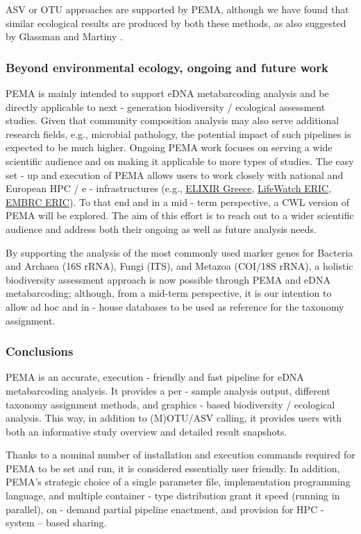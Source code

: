    ASV or OTU approaches are supported by PEMA, although we have found that similar ecological results are produced by both these methods, as also suggested by Glassman and Martiny \citep{glassman2018broadscale}.
   \subsubsection*{Beyond environmental ecology, ongoing and future work}

   PEMA is mainly intended to support eDNA metabarcoding analysis and be directly applicable to next - generation biodiversity / ecological assessment studies. 
   Given that community composition analysis may also serve additional research fields, e.g., microbial pathology, the potential impact of such pipelines is expected to be much higher. 
   Ongoing PEMA work focuses on serving a wide scientific audience and on making it applicable to more types of studies. 
   The easy set - up and execution of PEMA allows users to work closely with national and European HPC / e - infrastructures (e.g., \href{https://www.elixir-greece.org/}{ELIXIR Greece}, \href{https://www.lifewatch.eu/}{LifeWatch ERIC}, \href{ http://www.embrc.eu}{EMBRC ERIC}). 
   To that end and in a mid - term perspective, a CWL version of PEMA will be explored. 
   The aim of this effort is to reach out to a wider scientific audience and address both their ongoing as well as future analysis needs.

   By supporting the analysis of the most commonly used marker genes for Bacteria and Archaea (16S rRNA), Fungi (ITS), and Metazoa (COI/18S rRNA), a holistic biodiversity assessment approach is now possible through PEMA and eDNA metabarcoding; although, from a mid-term perspective, it is our intention to allow ad hoc and in - house databases to be used as reference for the taxonomy assignment.
   \subsubsection*{Conclusions}

   PEMA is an accurate, execution - friendly and fast pipeline for eDNA metabarcoding analysis. 
   It provides a per - sample analysis output, different taxonomy assignment methods, and graphics - based biodiversity / ecological analysis. 
   This way, in addition to (M)OTU/ASV calling, it provides users with both an informative study overview and detailed result snapshots.

   Thanks to a nominal number of installation and execution commands required for PEMA to be set and run, it is considered essentially user friendly. 
   In addition, PEMA's strategic choice of a single parameter file, implementation programming language, and multiple container - type distribution grant it speed (running in parallel), on - demand partial pipeline enactment, and provision for HPC - system – based sharing.

